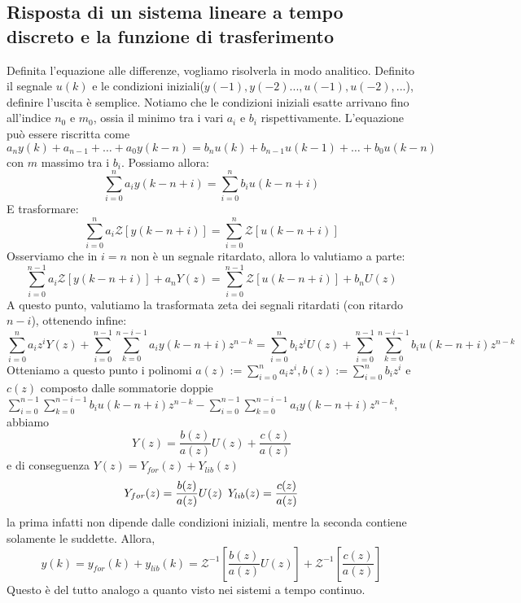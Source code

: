 \documentclass[11pt]{article}
\newcommand{\trz}{\mathcal{Z}}
\begin{document}
\subsection{Risposta di un sistema lineare a tempo discreto e la funzione di trasferimento}
Definita l'equazione alle differenze, vogliamo risolverla in modo analitico. Definito il segnale $u(k)$ e le condizioni iniziali($y(-1), y(-2)..., u(-1), u(-2),...$), definire l'uscita è semplice. Notiamo che le condizioni iniziali esatte arrivano fino all'indice $n_0$ e $m_0$, ossia il minimo tra i vari $a_i$ e $b_i$ rispettivamente.
L'equazione può essere riscritta come
\begin{displaymath}
    a_ny(k)+a_{n-1}+\dots+a_0y(k-n) = b_nu(k)+b_{n-1}u(k-1)+\dots+b_0u(k-n)
\end{displaymath}
con $m$ massimo tra i $b_i$. Possiamo allora:
\begin{displaymath}
    \sum_{i=0}^n a_i y(k-n+i) = \sum_{i=0}^n b_i u(k-n+i)
\end{displaymath}
E trasformare:
\begin{displaymath}
    \sum_{i=0}^{n} a_i \mathcal{Z}[y(k-n+i)]=\sum_{i=0}^{n} \mathcal{Z}[u(k-n+i)]
\end{displaymath}
Osserviamo che in $i=n$ non è un segnale ritardato, allora lo valutiamo a parte:
\begin{displaymath}
    \sum_{i=0}^{n-1} a_i \mathcal{Z}[y(k-n+i)] + a_n Y(z)=\sum_{i=0}^{n-1} \mathcal{Z}[u(k-n+i)] +b_n U(z)
\end{displaymath}
A questo punto, valutiamo la trasformata zeta dei segnali ritardati (con ritardo $n-i$), ottenendo infine:
\begin{displaymath}
    \sum_{i=0}^n a_i z^i Y(z) + \sum_{i=0}^{n-1}\sum_{k=0}^{n-i-1} a_i y (k-n+i) z^{n-k} = \sum_{i=0}^n b_i z^i U(z) + \sum_{i=0}^{n-1}\sum_{k=0}^{n-i-1} b_i u (k-n+i) z^{n-k}
\end{displaymath}
Otteniamo a questo punto i polinomi $a(z):=\sum_{i=0}^n a_iz^i, b(z):=\sum_{i=0}^n b_iz^i$ e $c(z)$ composto dalle sommatorie doppie $\sum_{i=0}^{n-1}\sum_{k=0}^{n-i-1} b_i u (k-n+i) z^{n-k} - \sum_{i=0}^{n-1}\sum_{k=0}^{n-i-1} a_i y (k-n+i) z^{n-k}$, abbiamo
\begin{displaymath}
    Y(z)=\frac{b(z)}{a(z)}U(z)+\frac{c(z)}{a(z)}
\end{displaymath}
e di conseguenza $Y(z) = Y_{for}(z)+Y_{lib}(z)$
\begin{displaymath}
    Y_{for}(z)=\frac{b(z)}{a(z)}U(z) \hspace{5px} Y_{lib} (z) = \frac{c(z)}{a(z)}
\end{displaymath}
la prima infatti non dipende dalle condizioni iniziali, mentre la seconda contiene solamente le suddette.
Allora,
\begin{displaymath}
    y(k) = y_{for}(k)+y_{lib}(k) = \trz^{-1}\left[\frac{b(z)}{a(z)}U(z)\right] + \trz^{-1}\left[\frac{c(z)}{a(z)}\right]
\end{displaymath}
Questo è del tutto analogo a quanto visto nei sistemi a tempo continuo.
\end{document}
